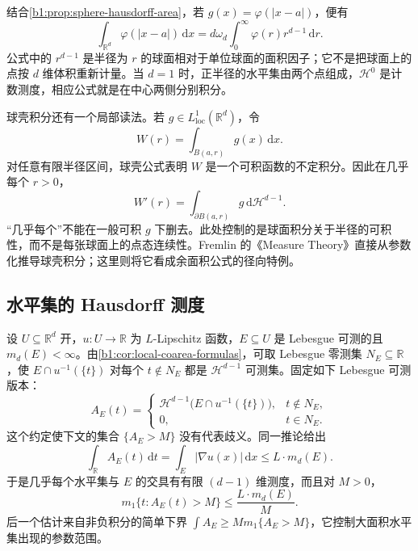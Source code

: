 结合\cref{b1:prop:sphere-hausdorff-area}，若 \(g(x)=\varphi(|x-a|)\)，便有
\begin{equation}\label{b1:eq:radial-one-dimensional-integral}
 \int_{\mathbb R^d}\varphi(|x-a|)\,\mathrm dx
 =d\omega_d\int_0^\infty\varphi(r)r^{d-1}\,\mathrm dr.
\end{equation}
公式中的 \(r^{d-1}\) 是半径为 \(r\) 的球面相对于单位球面的面积因子；它不是把球面上的点按 \(d\) 维体积重新计量。当 \(d=1\) 时，正半径的水平集由两个点组成，\(\mathcal H^0\) 是计数测度，相应公式就是在中心两侧分别积分。

\ProseParagraphBreak

球壳积分还有一个局部读法。若 \(g\in L^1_{\mathrm{loc}}(\mathbb R^d)\)，令
\[
 W(r)=\int_{B(a,r)}g(x)\,\mathrm dx.
\]
对任意有限半径区间，球壳公式表明 \(W\) 是一个可积函数的不定积分。因此在几乎每个 \(r>0\)，
\[
 W'(r)=\int_{\partial B(a,r)}g\,\mathrm d\mathcal H^{d-1}.
\]
“几乎每个”不能在一般可积 \(g\) 下删去。此处控制的是球面积分关于半径的可积性，而不是每张球面上的点态连续性。Fremlin 的《Measure Theory》\cite[265G]{Fremlin2016Measure}直接从参数化推导球壳积分；这里则将它看成余面积公式的径向特例。

\subsection{水平集的 Hausdorff 测度}
\label{b1:subsec:180302}

设 \(U\subseteq\mathbb R^d\) 开，\(u:U\to\mathbb R\) 为 \(L\)-Lipschitz 函数，\(E\subseteq U\) 是 Lebesgue 可测的且 \(m_d(E)<\infty\)。由\cref{b1:cor:local-coarea-formulas}，可取 Lebesgue 零测集 \(N_E\subseteq\mathbb R\)，使 \(E\cap u^{-1}(\{t\})\) 对每个 \(t\notin N_E\) 都是 \(\mathcal H^{d-1}\) 可测集。固定如下 Lebesgue 可测版本：
\[
 A_E(t)=
 \begin{cases}
 \mathcal H^{d-1}\bigl(E\cap u^{-1}(\{t\})\bigr),&t\notin N_E,\\
 0,&t\in N_E.
 \end{cases}
\]
这个约定使下文的集合 \(\{A_E>M\}\) 没有代表歧义。同一推论给出
\begin{equation}\label{b1:eq:level-area-average}
 \int_{\mathbb R}A_E(t)\,\mathrm dt
 =\int_E|\nabla u(x)|\,\mathrm dx
 \leq L\cdot m_d(E).
\end{equation}
于是几乎每个水平集与 \(E\) 的交具有有限 \((d-1)\) 维测度，而且对 \(M>0\)，
\[
 m_1\{t:A_E(t)>M\}\leq\frac{L\cdot m_d(E)}M.
\]
后一个估计来自非负积分的简单下界 \(\int A_E\geq M m_1\{A_E>M\}\)，它控制大面积水平集出现的参数范围。

\ProseParagraphBreak

